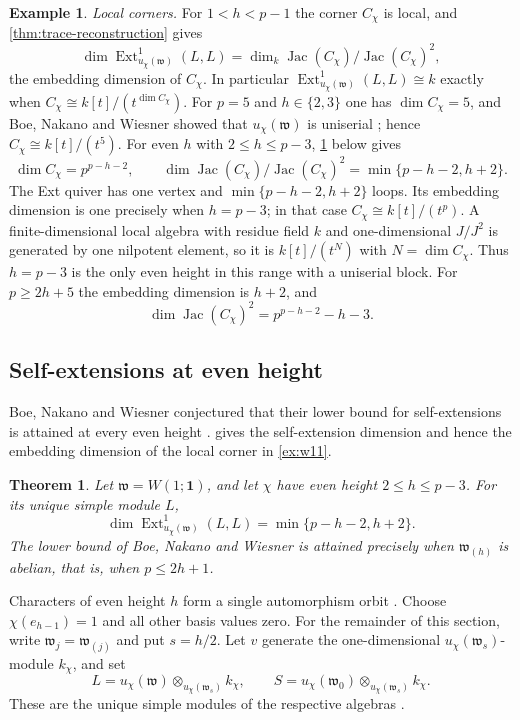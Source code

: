 \documentclass[11pt,reqno]{amsart}
\newtheorem{theorem}{Theorem}[section]
\theoremstyle{definition}
\theoremstyle{remark}
\theoremstyle{definition}
\newtheorem{example}[example]{Example}
\newcommand{\Jac}{\operatorname{Jac}}
\newcommand{\Ext}{\operatorname{Ext}}
\begin{document}
\begin{example}
\emph{Local corners.}  For $1<h<p-1$ the corner $C_\chi$ is local,
and \cref{thm:trace-reconstruction} gives
\[
 \dim\Ext^1_{u_\chi(\mathfrak w)}(L,L)
 =\dim_k\Jac(C_\chi)/\Jac(C_\chi)^2 ,
\]
the embedding dimension of $C_\chi$.  In particular
$\Ext^1_{u_\chi(\mathfrak w)}(L,L)\cong k$ exactly when
$C_\chi\cong k[t]/(t^{\dim C_\chi})$.  For $p=5$ and $h\in\{2,3\}$ one has
$\dim C_\chi=5$, and Boe, Nakano and Wiesner showed that $u_\chi(\mathfrak w)$
is uniserial \cite[\S4.3]{BoeNakanoWiesner2009}; hence
$C_\chi\cong k[t]/(t^5)$. For even $h$ with $2\le h\le p-3$, \cref{thm:bnw-main} below gives
\[
 \dim C_\chi=p^{p-h-2},\qquad
 \dim\Jac(C_\chi)/\Jac(C_\chi)^2=\min\{p-h-2,h+2\}.
\]
The Ext quiver has one vertex and $\min\{p-h-2,h+2\}$ loops.
Its embedding dimension is one precisely when $h=p-3$; in that case
$C_\chi\cong k[t]/(t^p)$. A finite-dimensional local algebra
with residue field $k$ and one-dimensional $J/J^2$ is generated by
one nilpotent element, so it is $k[t]/(t^N)$ with $N=\dim C_\chi$.
Thus $h=p-3$ is the only even height in this range with a uniserial block.
For $p\ge2h+5$ the embedding dimension is $h+2$, and
\[
 \dim\Jac(C_\chi)^2=p^{p-h-2}-h-3.
\]
\end{example}


\subsection{Self-extensions at even height}\label{subsec:w11-even}

Boe, Nakano and Wiesner conjectured that their lower bound for
self-extensions is attained at every even height
\cite[\S4.3]{BoeNakanoWiesner2009}.  gives the self-extension dimension and hence
the embedding dimension of the local corner in \cref{ex:w11}.

\begin{theorem}\label{thm:bnw-main}
Let $\mathfrak w=W(1;\mathbf1)$, and let $\chi$ have even height
$2\le h\le p-3$. For its unique simple module $L$,
\[
 \dim\Ext^1_{u_\chi(\mathfrak w)}(L,L)=\min\{p-h-2,h+2\}.
\]
The lower bound of Boe, Nakano and Wiesner
\cite[Proposition~4.3(B)]{BoeNakanoWiesner2009}
is attained precisely when $\mathfrak w_{(h)}$ is abelian, that is,
when $p\le2h+1$.
\end{theorem}

Characters of even height $h$ form a single automorphism orbit
\cite[\S4.3]{BoeNakanoWiesner2009}. Choose
$\chi(e_{h-1})=1$ and all other basis values zero. For the remainder of this section,
write $\mathfrak w_j=\mathfrak w_{(j)}$ and put $s=h/2$.
Let $v$ generate the one-dimensional $u_\chi(\mathfrak w_s)$-module
$k_\chi$, and set
\[
 L=u_\chi(\mathfrak w)\otimes_{u_\chi(\mathfrak w_s)}k_\chi,
 \qquad S=u_\chi(\mathfrak w_0)\otimes_{u_\chi(\mathfrak w_s)}k_\chi.
\]
These are the unique simple modules of the respective algebras
\cite[\S4.3]{BoeNakanoWiesner2009}.
\end{document}

